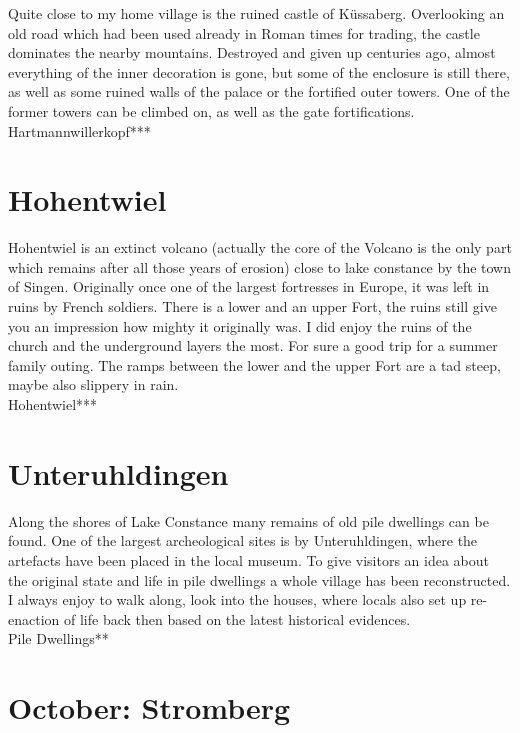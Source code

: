 Quite close to my home village is the ruined castle of K\"ussaberg. Overlooking an old road which had been used already in Roman times for trading, the castle dominates the nearby mountains. Destroyed and given up centuries ago, almost everything of the inner decoration is gone, but some of the enclosure is still there, as well as some ruined walls of the palace or the fortified outer towers. One of the former towers can be climbed on, as well as the gate fortifications.\\

Hartmannwillerkopf***

\section{Hohentwiel}
\label{1996:Hohentwiel}

Hohentwiel is an extinct volcano (actually the core of the Volcano is the only part which remains after all those years of erosion) close to lake constance by the town of Singen. Originally once one of the largest fortresses in Europe, it was left in ruins by French soldiers. There is a lower and an upper Fort, the ruins still give you an impression how mighty it originally was. I did enjoy the ruins of the church and the underground layers the most. For sure a good trip for a summer family outing. The ramps between the lower and the upper Fort are a tad steep, maybe also slippery in rain.\\

Hohentwiel***

\section{Unteruhldingen}
\label{1996:Unteruhldingen}

Along the shores of Lake Constance many remains of old pile dwellings can be found. One of the largest archeological sites is by Unteruhldingen, where the artefacts have been placed in the local museum. To give visitors an idea about the original state and life in pile dwellings a whole village has been reconstructed. I always enjoy to walk along, look into the houses, where locals also set up re-enaction of life back then based on the latest historical evidences.\\

Pile Dwellings**


\section{October: Stromberg}
\label{1996:Stromberg}

